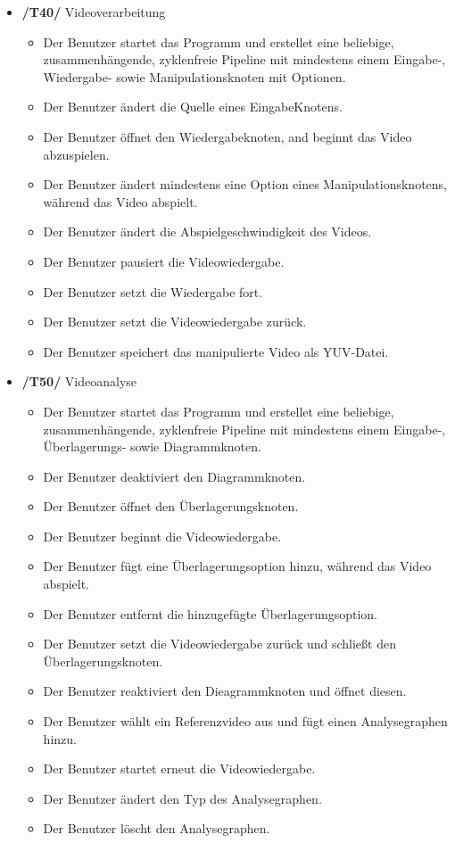 \begin{itemize}
\begin{itemize}
		\end{itemize}
\newpage
	\item\textbf{/T40/} Videoverarbeitung
		\begin{itemize}
			\item Der Benutzer startet das Programm und erstellet eine beliebige, zusammenhängende, zyklenfreie Pipeline mit mindestens einem Eingabe-, Wiedergabe- sowie 
				Manipulationsknoten mit Optionen.
			\item Der Benutzer ändert die Quelle eines EingabeKnotens.
			\item Der Benutzer öffnet den Wiedergabeknoten, and beginnt das Video abzuspielen.
			\item Der Benutzer ändert mindestens eine Option eines Manipulationsknotens, während das Video abspielt.
			\item Der Benutzer ändert die Abspielgeschwindigkeit des Videos.
			\item Der Benutzer pausiert die Videowiedergabe.
			\item Der Benutzer setzt die Wiedergabe fort.
			\item Der Benutzer setzt die Videowiedergabe zurück.
			\item Der Benutzer speichert das manipulierte Video als YUV-Datei.
		\end{itemize}
	\item\textbf{/T50/} Videoanalyse
		\begin{itemize}
			\item Der Benutzer startet das Programm und erstellet eine beliebige, zusammenhängende, zyklenfreie Pipeline mit mindestens einem Eingabe-, Überlagerungs- sowie 
				Diagrammknoten.
			\item Der Benutzer deaktiviert den Diagrammknoten.
			\item Der Benutzer öffnet den Überlagerungsknoten.
			\item Der Benutzer beginnt die Videowiedergabe.
			\item Der Benutzer fügt eine Überlagerungsoption hinzu, während das Video abspielt.
			\item Der Benutzer entfernt die hinzugefügte Überlagerungsoption.
			\item Der Benutzer setzt die Videowiedergabe zurück und schließt den Überlagerungsknoten.
			\item Der Benutzer reaktiviert den Dieagrammknoten und öffnet diesen.
			\item Der Benutzer wählt ein Referenzvideo aus und fügt einen Analysegraphen hinzu.
			\item Der Benutzer startet erneut die Videowiedergabe.
			\item Der Benutzer ändert den Typ des Analysegraphen.
			\item Der Benutzer löscht den Analysegraphen.
		\end{itemize}
\end{itemize}


